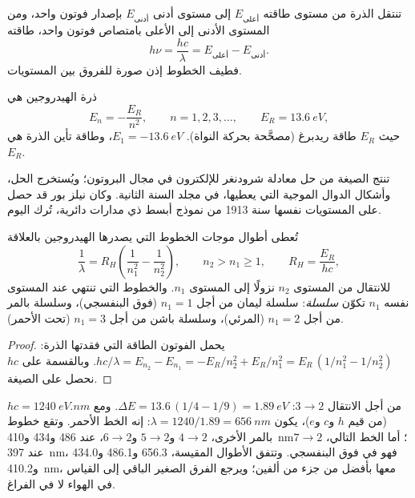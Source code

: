 تنتقل الذرة من مستوى طاقته $E_{\text{أعلى}}$ إلى مستوى أدنى
$E_{\text{أدنى}}$ بإصدار فوتون واحد، ومن المستوى الأدنى إلى الأعلى
بامتصاص فوتون واحد، طاقته
\[
  h\nu = \frac{hc}{\lambda} = E_{\text{أعلى}} - E_{\text{أدنى}} .
\]
فطيف الخطوط إذن صورة للفروق بين المستويات.

\begin{theorem}\label{thm:b1:quantum-numbers:levels}
 ذرة الهيدروجين هي
\[
  E_n = -\frac{E_R}{n^2}, \qquad n = 1, 2, 3, \dots,
  \qquad E_R = \qty{13.6}{eV},
\]
حيث $E_R$ طاقة ريدبرغ (مصحَّحة بحركة النواة). 
$E_1 = \qty{-13.6}{eV}$، وطاقة تأين الذرة
هي $E_R$.
\end{theorem}
\admitted

\begin{remark}\label{rem:b1:quantum-numbers:schrodinger}
تنتج الصيغة من حل معادلة شرودنغر للإلكترون في مجال البروتون؛ ويُستخرج
الحل، وأشكال الدوال الموجية التي يعطيها، في مجلد السنة الثانية. وكان
نيلز بور قد حصل على المستويات نفسها سنة 1913 من نموذج أبسط ذي مدارات
دائرية، تُرك اليوم.
\end{remark}

\begin{proposition}\label{prop:b1:quantum-numbers:rydberg}
تُعطى أطوال موجات الخطوط التي يصدرها الهيدروجين بالعلاقة
\[
  \frac{1}{\lambda} = R_H\left(\frac{1}{n_1^2} - \frac{1}{n_2^2}\right),
  \qquad n_2 > n_1 \ge 1, \qquad R_H = \frac{E_R}{hc},
\]
للانتقال من المستوى $n_2$ نزولًا إلى المستوى $n_1$. والخطوط التي
تنتهي عند المستوى نفسه $n_1$ تكوّن \emph{سلسلة}: سلسلة ليمان من أجل $n_1 = 1$
(فوق البنفسجي)، وسلسلة بالمر من أجل $n_1 = 2$ (المرئي)، وسلسلة باشن من أجل $n_1 = 3$
(تحت الأحمر).
\end{proposition}

\begin{proof}
يحمل الفوتون الطاقة التي فقدتها الذرة:
$hc/\lambda = E_{n_2} - E_{n_1} = -E_R/n_2^2 + E_R/n_1^2
= E_R\,(1/n_1^2 - 1/n_2^2)$. وبالقسمة على $hc$ نحصل على الصيغة.
\end{proof}

\begin{example}\label{ex:b1:quantum-numbers:halpha}
من أجل الانتقال $3 \to 2$: $\Delta E = 13.6\,(1/4 - 1/9) =
\qty{1.89}{eV}$. ومع $hc = \qty{1240}{eV.nm}$ (من قيم $h$
و$c$ و$e$)، يكون $\lambda = 1240/1.89 = \qty{656}{nm}$: إنه الخط الأحمر.
وتقع خطوط بالمر الأخرى، $4 \to 2$ و$5 \to 2$ و$6 \to 2$، عند 486
و434 و\qty{410}{nm}؛ أما الخط التالي، $7 \to 2$ عند \qty{397}{nm}،
فهو في فوق البنفسجي. وتتفق الأطوال المقيسة، 656.3 و486.1 و434.0
و\qty{410.2}{nm}، معها بأفضل من جزء من ألفين؛ ويرجع الفرق الصغير
الباقي إلى القياس في الهواء لا في الفراغ.
\end{example}

